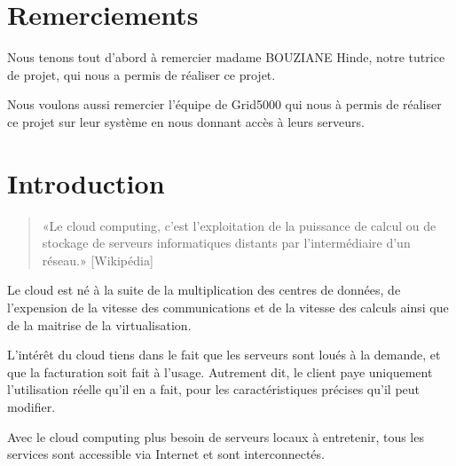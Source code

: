 \documentclass{report}
\title{%
    \begin{minipage}\linewidth
        \centering{
            RAPPORT DE PROJET \break
            "Cloud et virtualisation avec Openstack"
        }
    \end{minipage}
}
\author{%
    \begin{minipage}\linewidth
        \centering{Tutrice : BOUZIANE Hinde\break}
        \break
        \centering{
            Groupe : \break
            CULTY Alexandre,\break
            BENAIS Charles,\break
            BRESSAND Jérémy,\break
            ROGLIANO Théo
        }
        \break
    \end{minipage}
}
\date{2015 - 2016}
\begin{document}
\maketitle %

\tableofcontents %

\large %

\newpage
\chapter*{Remerciements}
    Nous tenons tout d'abord à remercier madame BOUZIANE Hinde, notre tutrice de projet, qui nous a permis de réaliser ce projet.\break

    Nous voulons aussi remercier l'équipe de Grid5000 qui nous à permis de réaliser ce projet sur leur système en nous donnant accès à leurs serveurs.


\newpage
\chapter*{Introduction}
    \begin{quote}
        «Le cloud computing, c'est l'exploitation de la puissance de calcul ou de stockage de serveurs informatiques distants par l'intermédiaire d'un réseau.» [Wikipédia]
    \end{quote}
    \bigbreak

    
    
    Le cloud est né à la suite de la multiplication des centres de données, de l'expension de la vitesse des communications et de la vitesse des calculs ainsi que de la maitrise de la virtualisation.\bigbreak

    L'intérêt du cloud tiens dans le fait que les serveurs sont loués à la demande, et que la facturation soit fait à l'usage. Autrement dit, le client paye uniquement l'utilisation réelle qu'il en a fait, pour les caractéristiques précises qu'il peut modifier.\bigbreak
    
    Avec le cloud computing plus besoin de serveurs locaux à entretenir, tous les services sont accessible via Internet et sont interconnectés.\bigbreak
    
\end{document}

